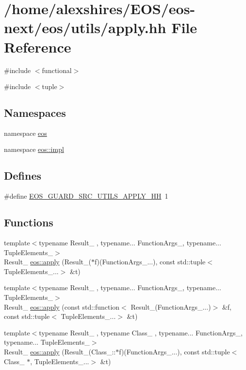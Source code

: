 \hypertarget{apply_8hh}{
\section{/home/alexshires/EOS/eos-\/next/eos/utils/apply.hh File Reference}
\label{apply_8hh}
}
{\ttfamily \#include $<$functional$>$}\par
{\ttfamily \#include $<$tuple$>$}\par
\subsection*{Namespaces}
\begin{DoxyCompactItemize}
\item 
namespace \hyperlink{namespaceeos}{eos}
\item 
namespace \hyperlink{namespaceeos_1_1impl}{eos::impl}
\end{DoxyCompactItemize}
\subsection*{Defines}
\begin{DoxyCompactItemize}
\item 
\#define \hyperlink{apply_8hh_a4328bcf6a6b86a72d4e546c8e99a0b5f}{EOS\_\-GUARD\_\-SRC\_\-UTILS\_\-APPLY\_\-HH}~1
\end{DoxyCompactItemize}
\subsection*{Functions}
\begin{DoxyCompactItemize}
\item 
{\footnotesize template$<$typename Result\_\- , typename... FunctionArgs\_\-, typename... TupleElements\_\-$>$ }\\Result\_\- \hyperlink{namespaceeos_a6d6ca72f35614029a62c270ec042d80c}{eos::apply} (Result\_\-($\ast$f)(FunctionArgs\_\-...), const std::tuple$<$ TupleElements\_\-...$>$ \&t)
\item 
{\footnotesize template$<$typename Result\_\- , typename... FunctionArgs\_\-, typename... TupleElements\_\-$>$ }\\Result\_\- \hyperlink{namespaceeos_a56ba31c6e8b9cd9a310e2df15220d202}{eos::apply} (const std::function$<$ Result\_\-(FunctionArgs\_\-...)$>$ \&f, const std::tuple$<$ TupleElements\_\-...$>$ \&t)
\item 
{\footnotesize template$<$typename Result\_\- , typename Class\_\- , typename... FunctionArgs\_\-, typename... TupleElements\_\-$>$ }\\Result\_\- \hyperlink{namespaceeos_a05333558aad48dbab3da261c54e3282d}{eos::apply} (Result\_\-(Class\_\-::$\ast$f)(FunctionArgs\_\-...), const std::tuple$<$ Class\_\- $\ast$, TupleElements\_\-...$>$ \&t)
\end{DoxyCompactItemize}


